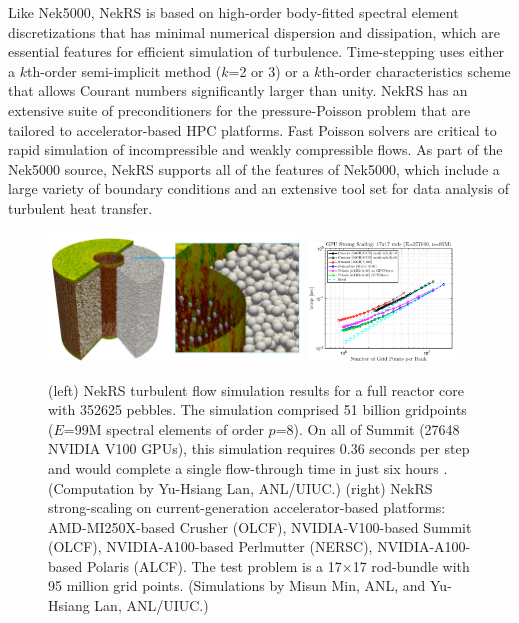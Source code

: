 Like Nek5000, NekRS is based on high-order body-fitted spectral element
discretizations that has minimal numerical dispersion and dissipation, which
are essential features for efficient simulation of turbulence.  Time-stepping
uses either a $k$th-order semi-implicit method ($k$=2 or 3) or a $k$th-order
characteristics scheme that allows Courant numbers significantly larger than
unity.  NekRS has an extensive suite of preconditioners for the
pressure-Poisson problem that are tailored to accelerator-based HPC platforms.
Fast Poisson solvers are critical to rapid simulation of incompressible and
weakly compressible flows.   As part of the Nek5000 source, NekRS supports all
of the features of Nek5000, which include a large variety of boundary conditions
and an extensive tool set for data analysis of turbulent heat transfer.



\begin{figure}[t!] \centering
    \includegraphics[width = 0.60\textwidth]{figs/pbr_pair.png}
    \includegraphics[width = 0.35\textwidth]{figs/nekrs_17x17_crusher_strong.png}
    \caption{(left) NekRS turbulent flow simulation results for a full reactor
core with 352625 pebbles.  The simulation comprised 51 billion gridpoints
($E$=99M spectral elements of order $p$=8).  On all of Summit (27648 NVIDIA
V100 GPUs), this simulation requires 0.36 seconds per step and would complete a
single flow-through time in just six hours \cite{sc22}. (Computation by
Yu-Hsiang Lan, ANL/UIUC.)
(right) NekRS strong-scaling on current-generation accelerator-based platforms:
AMD-MI250X-based Crusher (OLCF),
NVIDIA-V100-based Summit (OLCF),
NVIDIA-A100-based Perlmutter (NERSC),
NVIDIA-A100-based Polaris (ALCF).
The test problem is a 17$\times$17 rod-bundle with 95 million grid points.
(Simulations by Misun Min, ANL, and Yu-Hsiang Lan, ANL/UIUC.)
\label{fig:pbr}}
\end{figure}


